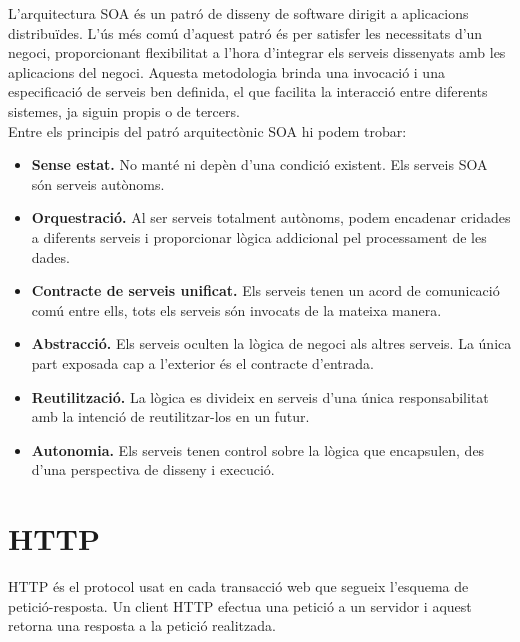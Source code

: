L'arquitectura \ac{SOA} és un patró de disseny de software dirigit a aplicacions distribuïdes. L'ús més comú d'aquest patró és per satisfer les necessitats d'un negoci, proporcionant flexibilitat a l'hora d'integrar els serveis dissenyats amb les aplicacions del negoci. Aquesta metodologia brinda una invocació i una especificació de serveis ben definida, el que facilita la interacció entre diferents sistemes, ja siguin propis o de tercers.\\

Entre els principis del patró arquitectònic \ac{SOA} hi podem trobar:

\begin{itemize}
	\item \textbf{Sense estat.} No manté ni depèn d'una condició existent. Els serveis \ac{SOA} són serveis autònoms.

	\item \textbf{Orquestració.} Al ser serveis totalment autònoms, podem encadenar cridades a diferents serveis i proporcionar lògica addicional pel processament de les dades.
	
	\item \textbf{Contracte de serveis unificat.} Els serveis tenen un acord de comunicació comú entre ells, tots els serveis són invocats de la mateixa manera.
	
	\item \textbf{Abstracció.} Els serveis oculten la lògica de negoci als altres serveis. La única part exposada cap a l'exterior és el contracte d'entrada.
	
	\item \textbf{Reutilització.} La lògica es divideix en serveis d'una única responsabilitat amb la intenció de reutilitzar-los en un futur.
	
	\item \textbf{Autonomia.} Els serveis tenen control sobre la lògica que encapsulen, des d'una perspectiva de disseny i execució.
\end{itemize}

\section{\ac{HTTP}}\label{sec_http}

\ac{HTTP} és el protocol usat en cada transacció web que segueix l'esquema de petició-resposta. Un client \ac{HTTP} efectua una petició a un servidor i aquest retorna una resposta a la petició realitzada.\\

